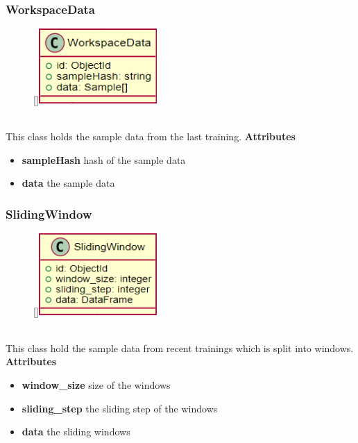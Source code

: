 \subsubsection{WorkspaceData}
\label{WorkspaceData}
\begin{figure}
    \raisebox{0pt}[\dimexpr{}\baselineskip\relax]{\includegraphics[width=4.5cm]{classes/model-management/14.png}}
\end{figure} 
~\\
This class holds the sample data from the last training.
\newline
\newline
\newline
\newline
\newline
\newline
\textbf{Attributes}
\begin{itemize}
    \item \textbf{sampleHash} hash of the sample data
    \item \textbf{data} the sample data
\end{itemize}

\subsubsection{SlidingWindow}
\label{SlidingWindow}
\begin{figure}
    \raisebox{0pt}[\dimexpr{}\baselineskip\relax]{\includegraphics[width=4.5cm]{classes/model-management/15.png}}
\end{figure} 
~\\
This class hold the sample data from recent trainings which is split into windows.
\newline
\newline
\newline
\newline
\newline
\newline
\textbf{Attributes}
\begin{itemize}
    \item \textbf{window\_size} size of the windows
    \item \textbf{sliding\_step} the sliding step of the windows
    \item \textbf{data} the sliding windows
\end{itemize}

